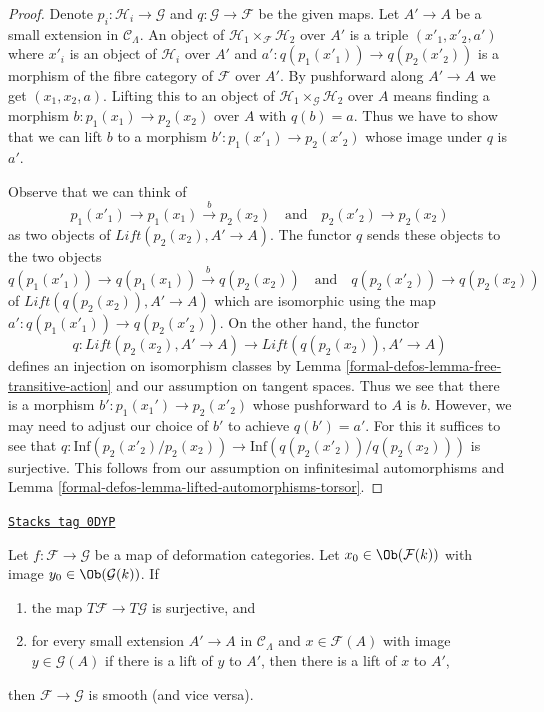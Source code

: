 \begin{proof}
Denote $p_i : \mathcal{H}_i \to \mathcal{G}$ and
$q : \mathcal{G} \to \mathcal{F}$ be the given maps.
Let $A' \to A$ be a small extension in $\mathcal{C}_\Lambda$.
An object of $\mathcal{H}_1 \times_\mathcal{F} \mathcal{H}_2$
over $A'$ is a triple $(x'_1, x'_2, a')$ where
$x'_i$ is an object of $\mathcal{H}_i$ over $A'$ and
$a' : q(p_1(x'_1)) \to q(p_2(x'_2))$ is a morphism
of the fibre category of $\mathcal{F}$ over $A'$.
By pushforward along $A' \to A$ we get
$(x_1, x_2, a)$. Lifting this to an object of
$\mathcal{H}_1 \times_\mathcal{G} \mathcal{H}_2$
over $A$ means finding a morphism
$b : p_1(x_1) \to p_2(x_2)$ over $A$ with $q(b) = a$.
Thus we have to show that we can lift $b$ to a morphism
$b' : p_1(x'_1) \to p_2(x'_2)$ whose image under $q$ is $a'$.

\medskip\noindent
Observe that we can think of
$$
p_1(x'_1) \to p_1(x_1) \xrightarrow{b} p_2(x_2)
\quad\text{and}\quad
p_2(x'_2) \to p_2(x_2)
$$
as two objects of $\textit{Lift}(p_2(x_2), A' \to A)$.
The functor $q$ sends these objects to the two objects
$$
q(p_1(x'_1)) \to q(p_1(x_1)) \xrightarrow{b} q(p_2(x_2))
\quad\text{and}\quad
q(p_2(x'_2)) \to q(p_2(x_2))
$$
of $\textit{Lift}(q(p_2(x_2)), A' \to A)$
which are isomorphic using the map $a' : q(p_1(x'_1)) \to q(p_2(x'_2))$.
On the other hand, the functor
$$
q : \textit{Lift}(p_2(x_2), A' \to A) \to
\textit{Lift}(q(p_2(x_2)), A' \to A)
$$
defines an injection on isomorphism classes by
Lemma \ref{formal-defos-lemma-free-transitive-action}
and our assumption on tangent spaces. Thus we see that there is a morphism
$b' : p_1(x_1') \to p_2(x'_2)$ whose pushforward to $A$ is $b$.
However, we may need to adjust our choice of $b'$
to achieve $q(b') = a'$. For this it suffices to see that
$q : \text{Inf}(p_2(x'_2)/p_2(x_2)) \to \text{Inf}(q(p_2(x'_2))/q(p_2(x_2)))$
is surjective. This follows from our assumption on
infinitesimal automorphisms and Lemma \ref{formal-defos-lemma-lifted-automorphisms-torsor}.
\end{proof}

\begin{lemma}
\label{formal-defos-lemma-easy-check-smooth}
\href{https://stacks.math.columbia.edu/tag/0DYP}{\texttt{Stacks tag 0DYP}}

Let $f : \mathcal{F} \to \mathcal{G}$ be a map of deformation
categories. Let $x_0 \in \Ob(\mathcal{F}(k))$ with image
$y_0 \in \Ob(\mathcal{G}(k))$. If
\begin{enumerate}
\item the map $T\mathcal{F} \to T\mathcal{G}$ is surjective, and
\item for every small extension $A' \to A$ in $\mathcal{C}_\Lambda$
and $x \in \mathcal{F}(A)$ with image $y \in \mathcal{G}(A)$
if there is a lift of $y$ to $A'$, then there is a lift
of $x$ to $A'$,
\end{enumerate}
then $\mathcal{F} \to \mathcal{G}$ is smooth (and vice versa).
\end{lemma}

